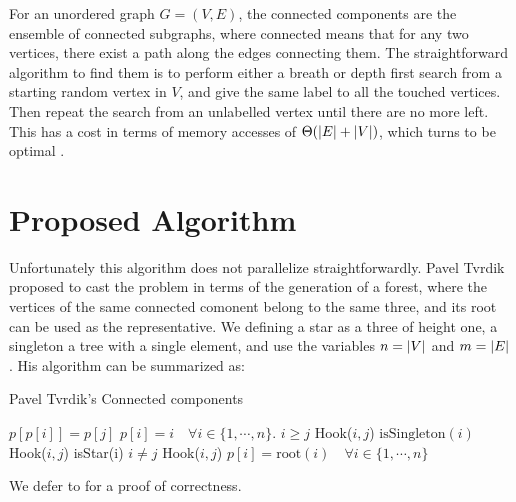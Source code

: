 %

For an unordered graph $G=(V,E)$, the connected components are the ensemble
of connected subgraphs, where connected means that for any two  vertices, there exist a path along the
 edges connecting them.
The straightforward algorithm to find them is to perform either a breath or depth first search from a starting
random vertex in $V$, and give the same label to all the touched vertices. Then repeat the search from an unlabelled vertex
until there are no more left.
This has a cost in terms of memory accesses of $\Theta(\left| E \right| + \left| V \right|)$, which turns to be optimal \cite{Hopcroft}.

\section{Proposed Algorithm}\label{sec:yourmethod}
%
%

Unfortunately this algorithm does not parallelize straightforwardly. Pavel Tvrdik \cite{PCompClass}
proposed to cast the problem in terms of the generation of a forest, where the vertices of the same connected comonent belong
to the same three, and its root can be used as the representative.
We defining a star as a three of height one, a singleton a tree with a single element, and use the variables
 $n=\left| V \right|$ and $m=\left| E \right|$.
His algorithm can be summarized as:

\begin{algorithm}%
    \caption{Pavel Tvrdik's Connected components}
    \label{algorithm:cc1}
    \begin{algorithmic}[1]
          \State $p[p[i]] = p[j]$
        \EndProcedure
          \State $p[i] = i \quad \forall i \in \{1,\cdots, n\}$. 
         
          \State  \kif $i\ge j$ \kthen Hook($i, j$)
          \State  \kif $\text{isSingleton}(i)$ \kthen Hook($i, j$)
        \EndFor
         
          \State  \kif isStar(i) \kand $i \neq j$ \kthen Hook($i, j$)
        \EndFor
        \State $p[i] = \text{root}(i) \quad \forall i \in \{1,\cdots, n\}$ 
        \EndWhile
        \EndProcedure
   \end{algorithmic}
\end{algorithm}
We defer to \cite{PCompClass} for a proof of correctness.

